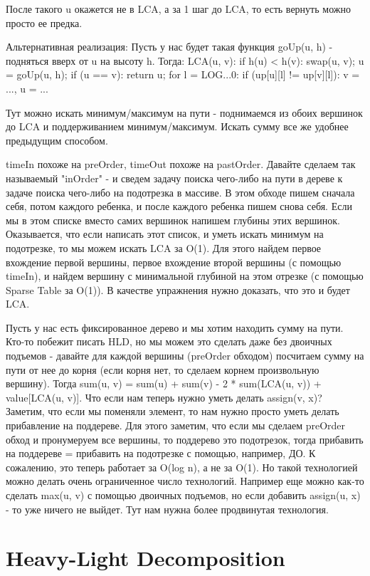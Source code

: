 После такого u окажется не в LCA, а за 1 шаг до LCA, то есть вернуть можно просто ее предка.

Альтернативная реализация:
Пусть у нас будет такая функция goUp(u, h) - подняться вверх от u на высоту h. Тогда:
LCA(u, v):
	if h(u) < h(v):
		swap(u, v);
	u = goUp(u, h);
	if (u == v):
		return u;
	for l = LOG...0:
		if (up[u][l] != up[v][l]):
			v = ..., u = ...

Тут можно искать минимум/максимум на пути - поднимаемся из обоих вершинок до LCA и поддерживанием минимум/максимум. Искать сумму все же удобнее предыдущим способом.

timeIn похоже на preOrder, timeOut похоже на pastOrder. Давайте сделаем так называемый "inOrder" - и сведем задачу поиска чего-либо на пути в дереве к задаче поиска чего-либо на подотрезка в массиве. В этом обходе пишем сначала себя, потом каждого ребенка, и после каждого ребенка пишем снова себя. Если мы в этом списке вместо самих вершинок напишем глубины этих вершинок. Оказывается, что если написать этот список, и уметь искать минимум на подотрезке, то мы можем искать LCA за O(1). Для этого найдем первое вхождение первой вершины, первое вхождение второй вершины (с помощью timeIn), и найдем вершину с минимальной глубиной на этом отрезке (с помощью Sparse Table за O(1)). В качестве упражнения нужно доказать, что это и будет LCA. 

Пусть у нас есть фиксированное дерево и мы хотим находить сумму на пути. Кто-то побежит писать HLD, но мы можем это сделать даже без двоичных подъемов - давайте для каждой вершины (preOrder обходом) посчитаем сумму на пути от нее до корня (если корня нет, то сделаем корнем произвольную вершину). Тогда sum(u, v) = sum(u) + sum(v) - 2 * sum(LCA(u, v)) + value[LCA(u, v)]. 
Что если нам теперь нужно уметь делать assign(v, x)? Заметим, что если мы поменяли элемент, то нам нужно просто уметь делать прибавление на поддереве. Для этого заметим, что если мы сделаем preOrder обход и пронумеруем все вершины, то поддерево это подотрезок, тогда прибавить на поддереве = прибавить на подотрезке с помощью, например, ДО. К сожалению, это теперь работает за O(log n), а не за O(1). Но такой технологией можно делать очень ограниченное число технологий. Например еще можно как-то сделать max(u, v) с помощью двоичных подъемов, но если добавить assign(u, x) - то уже ничего не выйдет. Тут нам нужна более продвинутая технология.




\section{Heavy-Light Decomposition}




